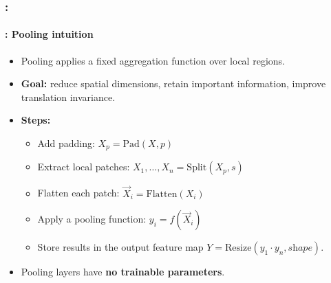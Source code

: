 \documentclass[xcolor=table]{beamer}
\begin{document}
\begin{frame}
	\frametitle{\insertshortsubtitle: \insertsection}
	\framesubtitle{\insertsubsection: Pooling intuition}
	
	\begin{itemize}
		
		\item Pooling applies a fixed aggregation function over local regions.
		
		\item \textbf{Goal:} reduce spatial dimensions, retain important information, improve translation invariance.
		
		\item \textbf{Steps:}
		\begin{itemize}
			\item Add padding: $X_p = \mathrm{Pad}(X, p)$
			
			\item Extract local patches: $X_1,\dots,X_n = \mathrm{Split}(X_p, s)$
			
			\item Flatten each patch: $\vec{X}_i = \mathrm{Flatten}(X_i)$
			
			\item Apply a pooling function: $y_i = f(\vec{X}_i)$
			
			\item Store results in the output feature map $Y = \text{Resize}(y_1 \cdot y_n, \textit{shape})$.
		\end{itemize}
		
		\item Pooling layers have \textbf{no trainable parameters}.
		
	\end{itemize}
	
	\begin{center}
	\end{center}
	
\end{frame}
\end{document}

